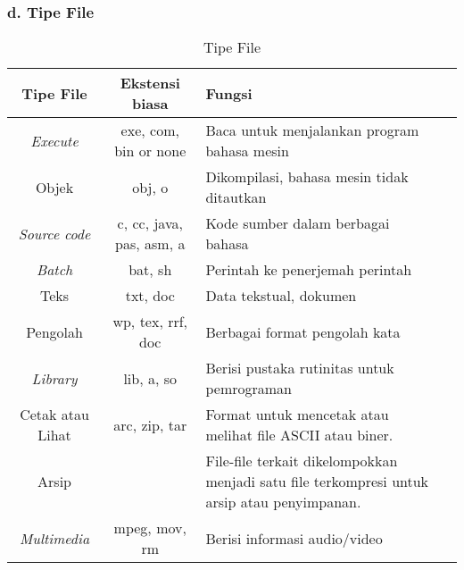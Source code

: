 \documentclass[12pt]{article}
\begin{document}
\subsubsection*{d. Tipe File}

\begin{table}[htbp] %
    \centering
    \begin{tabular}{|c|c|p{6cm}|p{8cm}|} %
    \hline
\textbf{Tipe File}      & \textbf{Ekstensi biasa}        & \textbf{Fungsi}                                                      \\ \hline
\textit{Execute}              & exe, com, bin or none           & Baca untuk menjalankan program bahasa mesin                                   \\ \hline
Objek                  & obj, o                          & Dikompilasi, bahasa mesin tidak ditautkan                                  \\ \hline
\textit{Source code}             & c, cc, java, pas, asm, a        & Kode sumber dalam berbagai bahasa                                      \\ \hline
\textit{Batch}                   & bat, sh                        & Perintah ke penerjemah perintah                                    \\ \hline
Teks                   & txt, doc                        & Data tekstual, dokumen                                                 \\ \hline
Pengolah          & wp, tex, rrf, doc            & Berbagai format pengolah kata                                          \\ \hline
\textit{Library}                & lib, a, so                & Berisi pustaka rutinitas untuk pemrograman                                   \\ \hline
Cetak atau Lihat           & arc, zip, tar                  & Format untuk mencetak atau melihat file ASCII atau biner.              \\ \hline
Arsip                 & {arc, zip, tar                   & File-file terkait dikelompokkan menjadi satu file terkompresi untuk arsip atau penyimpanan. \\ \hline
\textit{Multimedia}              & mpeg, mov, rm                  & Berisi informasi audio/video                       \\ \hline
\end{tabular}

    \caption{Tipe File}
    \label{tab:your_label}
\end{table}
\end{document}
